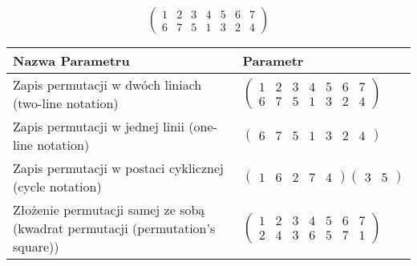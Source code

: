 \documentclass[12pt]{article}
\begin{document}
\subsection{}
\begin{center}
\[
\begin{pmatrix}
	1 & 2 & 3 & 4 & 5 & 6 & 7 \\ 
	6 & 7 & 5 & 1 & 3 & 2 & 4 
\end{pmatrix}
\]

\begin{tabular}{|m{0.6\linewidth}|m{0.4\linewidth}|}
	\hline
	Nazwa Parametru & Parametr \\
	\hline
	Zapis permutacji w dwóch liniach (two-line notation) & $\begin{pmatrix} 1 & 2 & 3 & 4 & 5 & 6 & 7 \\ 
6 & 7 & 5 & 1 & 3 & 2 & 4 \end{pmatrix}$ \\ 
	\hline
	Zapis permutacji w jednej linii (one-line notation) & $\begin{pmatrix} 6 & 7 & 5 & 1 & 3 & 2 & 4 \end{pmatrix}$ \\ 
	\hline
	Zapis permutacji w postaci cyklicznej (cycle notation) & $\begin{pmatrix} 1 & 6 & 2 & 7 & 4 \end{pmatrix} \begin{pmatrix} 3 & 5 \end{pmatrix} $ \\ 
	\hline
	Złożenie permutacji samej ze sobą (kwadrat permutacji (permutation's square)) & $\begin{pmatrix} 1 & 2 & 3 & 4 & 5 & 6 & 7 \\ 
2 & 4 & 3 & 6 & 5 & 7 & 1 \end{pmatrix}$ \\ 
	\hline
\end{tabular}
\end{center}
\end{document}
